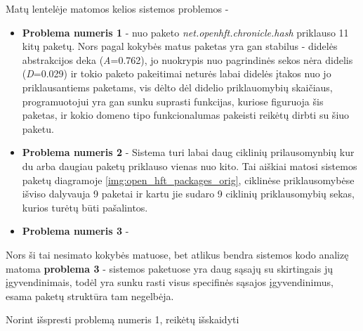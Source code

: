 Matų lentelėje matomos kelios sistemos problemos -
\begin{itemize}
    \item \textbf{Problema numeris 1} - nuo paketo \textit{net.openhft.chronicle.hash} priklauso 11 kitų paketų.
    Nors pagal kokybės matus paketas yra gan stabilus - didelės abstrakcijos deka (\textit{A}=0.762), jo nuokrypis nuo pagrindinės sekos nėra didelis (\textit{D}=0.029) ir
    tokio paketo pakeitimai neturės labai didelės įtakos nuo jo priklausantiems paketams, vis dėlto dėl didelio priklauomybių skaičiaus, programuotojui yra gan sunku suprasti funkcijas,
    kuriose figuruoja šis paketas, ir kokio domeno tipo funkcionalumas pakeisti reikėtų dirbti su šiuo paketu.
    \item \textbf{Problema numeris 2} - Sistema turi labai daug ciklinių prilausomynbių kur du arba daugiau paketų priklauso vienas nuo kito.
    Tai aiškiai matosi sistemos paketų diagramoje \ref{img:open_hft_packages_orig}, ciklinėse priklausomybėse išviso dalyvauja 9 paketai ir kartu jie sudaro 9 ciklinių priklausomybių sekas,
    kurios turėtų būti pašalintos.
    \item \textbf{Problema numeris 3} -
\end{itemize}
Nors ši tai nesimato kokybės matuose, bet atlikus bendra sistemos kodo analizę matoma \textbf{problema 3} - sistemos paketuose yra daug sąsajų su skirtingais jų įgyvendinimais, todėl yra sunku
rasti visus specifinės sąsajos įgyvendinimus, esama paketų struktūra tam negelbėja.


Norint išspresti problemą numeris 1, reikėtų išskaidyti